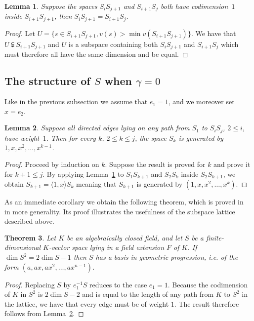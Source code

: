 \documentclass[10pt]{amsart}
\newtheorem{theo}{Theorem}[section]
\newtheorem{lemm}[theo]{Lemma}
\theoremstyle{definition}
\theoremstyle{remark}
\renewcommand{\leq}{\leqslant}
\begin{document}
\begin{lemm}\label{lem:codim1}
Suppose the spaces $S_iS_{j+1}$ and $S_{i+1}S_j$ both have codimension~$1$ inside $S_{i+1}S_{j+1}$, then $S_iS_{j+1}= S_{i+1}S_j$.
\end{lemm}

\begin{proof}
Let $U=\{s\in S_{i+1}S_{j+1}, v(s)>\min v(S_{i+1}S_{j+1})\}$. We have that $U\subsetneqq S_{i+1}S_{j+1}$ and $U$ is a subspace containing both $S_iS_{j+1}$ and $S_{i+1}S_j$ which must therefore all have the same dimension and be equal.
\end{proof}

\subsection{The structure of \texorpdfstring{$S$}{S} when \texorpdfstring{$\gamma=0$}{gamma=0}}\label{sec:Vosper}

Like in the previous subsection we assume that $e_1=1$, and we moreover set $x=e_2$.

\begin{lemm}\label{lem:vosper}
Suppose all directed edges lying on any path from $S_1$ to $S_iS_j$, $2\leq i$, have weight~$1$. Then for every $k$, $2\leq k\leq j$, the space $S_k$ is generated by $1,x,x^2,\ldots,x^{k-1}$.
\end{lemm}

\begin{proof}
Proceed by induction on $k$. Suppose the result is proved for $k$ and prove it for $k+1\leq j$. By applying Lemma~\ref{lem:codim1} to $S_1S_{k+1}$ and $S_2S_k$ inside $S_2S_{k+1}$, we obtain $S_{k+1}=\langle 1,x\rangle S_k$ meaning that $S_{k+1}$ is generated by $(1,x,x^2,\ldots,x^{k})$.
\end{proof}

As an immediate corollary we obtain the following theorem, which is proved in~\cite{bszVosper} in more generality. Its proof illustrates the usefulness of the subspace lattice described above.


\begin{theo}\label{thm:genus0}
Let $K$ be an algebraically closed field, and let $S$ be a finite-dimensional $K$-vector space lying in a field extension $F$ of $K$. If $\dim S^2=2\dim S-1$ then $S$ has a basis in geometric progression, i.e. of the form $(a,ax,ax^2,\ldots,ax^{n-1})$.
\end{theo}

\begin{proof}
Replacing $S$ by $e_1^{-1}S$ reduces to the case
$e_1=1$. Because the codimension of $K$ in $S^2$ is $2\dim S-2$ and is equal to the length of any path from $K$ to $S^2$ in the lattice, we have that every edge must be of weight $1$. The result therefore follows from Lemma~\ref{lem:vosper}.
\end{proof}
\end{document}
